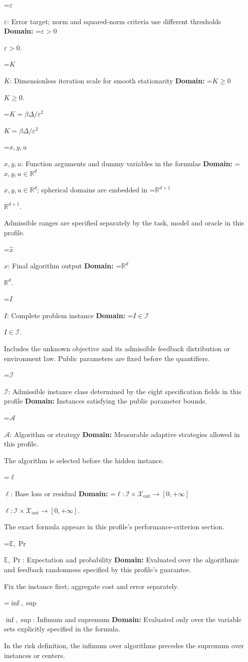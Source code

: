 \documentclass[10pt,a4paper]{article}
\newcommand{\AtlasMath}[1]{\par\begingroup\centering\setbox0=\hbox{$\displaystyle #1$}\ifdim\wd0>1.4\linewidth\typeout{ATLAS WIDE FORMULA: \the\wd0}\fi\ifdim\wd0>\linewidth\resizebox{\linewidth}{!}{\box0}\else\box0\fi\par\endgroup}
\newcommand{\AtlasInlineMath}[1]{\begingroup\setbox0=\hbox{$#1$}\ifdim\wd0>.4\linewidth\endgroup\AtlasMath{#1}\else\endgroup$#1$\fi}
\begin{document}
\AtlasInlineMath{\varepsilon}: Error target; norm and squared-norm criteria use different thresholds \textbf{Domain:} \AtlasInlineMath{\varepsilon>0}.

\AtlasInlineMath{K}: Dimensionless iteration scale for smooth stationarity \textbf{Domain:} \AtlasInlineMath{K\ge0}.

\AtlasInlineMath{K=\beta\Delta/\varepsilon^2}

\AtlasInlineMath{x,y,u}: Function arguments and dummy variables in the formulas \textbf{Domain:} \AtlasInlineMath{x,y,u\in\mathbb{R}^d}; spherical domains are embedded in \AtlasInlineMath{\mathbb{R}^{d+1}}.

Admissible ranges are specified separately by the task, model and oracle in this profile.

\AtlasInlineMath{\widehat{x}}: Final algorithm output \textbf{Domain:} \AtlasInlineMath{\mathbb{R}^d}.

\AtlasInlineMath{I}: Complete problem instance \textbf{Domain:} \AtlasInlineMath{I\in\mathcal{I}}.

Includes the unknown objective and its admissible feedback distribution or environment law. Public parameters are fixed before the quantifiers.

\AtlasInlineMath{\mathcal{I}}: Admissible instance class determined by the eight specification fields in this profile \textbf{Domain:} Instances satisfying the public parameter bounds.

\AtlasInlineMath{\mathcal{A}}: Algorithm or strategy \textbf{Domain:} Measurable adaptive strategies allowed in this profile.

The algorithm is selected before the hidden instance.

\AtlasInlineMath{\ell}: Base loss or residual \textbf{Domain:} \AtlasInlineMath{\ell:\mathcal{I}\times\mathcal{X}_{\mathrm{out}}\to[0,+\infty]}.

The exact formula appears in this profile's performance-criterion section.

\AtlasInlineMath{\mathbb{E},\Pr}: Expectation and probability \textbf{Domain:} Evaluated over the algorithmic and feedback randomness specified by this profile's guarantee.

Fix the instance first; aggregate cost and error separately.

\AtlasInlineMath{\inf,\sup}: Infimum and supremum \textbf{Domain:} Evaluated only over the variable sets explicitly specified in the formula.

In the risk definition, the infimum over algorithms precedes the supremum over instances or centers.
\end{document}
